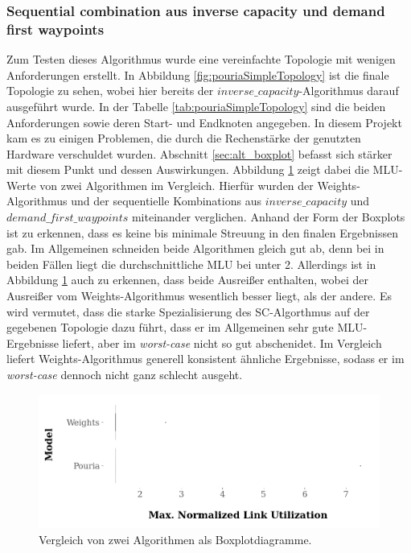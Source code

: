 \documentclass[sigconf, nonacm, review]{acmart}
\begin{document}
\subsubsection{Sequential combination aus inverse capacity und demand first waypoints}
\label{sec:seq_com_p2}
Zum Testen dieses Algorithmus wurde eine vereinfachte Topologie mit wenigen Anforderungen erstellt.
In Abbildung \ref{fig:pouriaSimpleTopology} ist die finale Topologie zu sehen, 
wobei hier bereits der $inverse\_capacity$-Algorithmus darauf ausgef\"uhrt wurde.
In der Tabelle \ref{tab:pouriaSimpleTopology} sind die beiden Anforderungen sowie deren Start- und Endknoten angegeben.
In diesem Projekt kam es zu einigen Problemen, die durch die Rechenst\"arke der genutzten Hardware verschuldet wurden.
Abschnitt \ref{sec:alt_boxplot} befasst sich st\"arker mit diesem Punkt und dessen Auswirkungen.
Abbildung \ref{fig:pouria_boxplot_no_boxes} zeigt dabei die MLU-Werte von zwei Algorithmen im Vergleich.
Hierf\"ur wurden der Weights-Algorithmus und der sequentielle Kombinations aus $inverse\_capacity$ und $demand\_first\_waypoints$ miteinander verglichen.\newline
Anhand der Form der Boxplots ist zu erkennen, dass es keine bis minimale Streuung in den finalen Ergebnissen gab.
Im Allgemeinen schneiden beide Algorithmen gleich gut ab, denn bei in beiden F\"allen liegt die durchschnittliche MLU bei unter 2.
Allerdings ist in Abbildung \ref{fig:pouria_boxplot_no_boxes} auch zu erkennen, dass beide Ausrei\ss er enthalten,
wobei der Ausrei\ss er vom Weights-Algorithmus wesentlich besser liegt, als der andere.
Es wird vermutet, dass die starke Spezialisierung des SC-Algorthmus auf der gegebenen Topologie dazu f\"uhrt, 
dass er im Allgemeinen sehr gute MLU-Ergebnisse liefert,
aber im \emph{worst-case} nicht so gut abschenidet.
Im Vergleich liefert Weights-Algorithmus generell konsistent \"ahnliche Ergebnisse,
sodass er im \emph{worst-case} dennoch nicht ganz schlecht ausgeht.
\begin{figure}
\centering
\includegraphics[width=\linewidth]{figures/pouria_boxplot_no_boxes.png}
\caption{Vergleich von zwei Algorithmen als Boxplotdiagramme.}
\label{fig:pouria_boxplot_no_boxes}
\end{figure}
\end{document}
